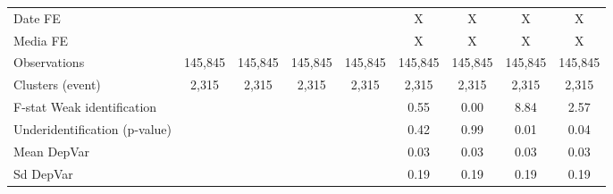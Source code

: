 {\begin{tabular}{l*{8}{c}}
\hline
Date FE             &                     &                     &                     &                     &           X         &           X         &           X         &           X         \\
Media FE            &                     &                     &                     &                     &           X         &           X         &           X         &           X         \\
Observations        &     145,845         &     145,845         &     145,845         &     145,845         &     145,845         &     145,845         &     145,845         &     145,845         \\
Clusters (event)    &       2,315         &       2,315         &       2,315         &       2,315         &       2,315         &       2,315         &       2,315         &       2,315         \\
F-stat Weak identification&                     &                     &                     &                     &        0.55         &        0.00         &        8.84         &        2.57         \\
Underidentification (p-value)&                     &                     &                     &                     &        0.42         &        0.99         &        0.01         &        0.04         \\
Mean DepVar         &                     &                     &                     &                     &        0.03         &        0.03         &        0.03         &        0.03         \\
Sd DepVar           &                     &                     &                     &                     &        0.19         &        0.19         &        0.19         &        0.19         \\
\hline\hline
\end{tabular}
}
